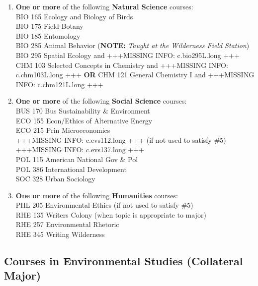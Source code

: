 \documentclass[
  letterpaper,
]{scrbook}
\providecommand{\tightlist}{%
  \setlength{\itemsep}{0pt}\setlength{\parskip}{0pt}}
\begin{document}
\begin{enumerate}
  \begin{enumerate}
  \def\labelenumii{\alph{enumii}.}
  \tightlist
  \item
    \textbf{One or more} of the following \textbf{Natural Science}
    courses:\\
    BIO 165 Ecology and Biology of Birds\\
    BIO 175 Field Botany\\
    BIO 185 Entomology\\
    BIO 285 Animal Behavior (\textbf{NOTE:} \emph{Taught at the
    Wilderness Field Station})\\
    BIO 295 Spatial Ecology and +++MISSING INFO: c.bio295L.long +++\\
    CHM 103 Selected Concepts in Chemistry and +++MISSING INFO:
    c.chm103L.long +++ \textbf{OR} CHM 121 General Chemistry I and
    +++MISSING INFO: c.chm121L.long +++\\
  \item
    \textbf{One or more} of the following \textbf{Social Science}
    courses:\\
    BUS 170 Bus Sustainability \& Environment\\
    ECO 155 Econ/Ethics of Alternative Energy\\
    ECO 215 Prin Microeconomics\\
    +++MISSING INFO: c.evs112.long +++ (if not used to satisfy \#5)\\
    +++MISSING INFO: c.evs137.long +++\\
    POL 115 American National Gov \& Pol\\
    POL 386 International Development\\
    SOC 328 Urban Sociology\\
  \item
    \textbf{One or more} of the following \textbf{Humanities} courses:\\
    PHL 205 Environmental Ethics (if not used to satisfy \#5)\\
    RHE 135 Writers Colony (when topic is appropriate to major)\\
    RHE 257 Environmental Rhetoric\\
    RHE 345 Writing Wilderness
  \end{enumerate}
\end{enumerate}

\subsection{Courses in Environmental Studies (Collateral
Major)}\label{courses-in-environmental-studies-collateral-major}
\end{document}
